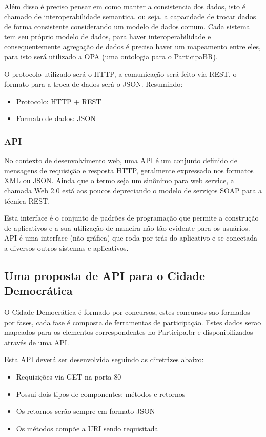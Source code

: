 \documentclass[12pt]{article}
\begin{document}
Além disso é preciso pensar em como manter a consistencia dos dados, isto é
chamado de interoperabilidade semantica, ou seja, a capacidade de trocar dados
de forma consistente considerando um modelo de dados comum. Cada sistema tem
seu próprio modelo de dados, para haver interoperabilidade e consequentemente
agregação de dados é preciso haver um mapeamento entre eles, para isto será
utilizado a OPA (uma ontologia para o ParticipaBR).

O protocolo utilizado será o HTTP, a comunicação será feito via REST,
o formato para a troca de dados será o JSON\cite{json}. Resumindo:

\begin{itemize}
  \item Protocolo: HTTP + REST
  \item Formato de dados: JSON
\end{itemize}

\subsubsection{API}

No contexto de desenvolvimento web, uma API é um conjunto definido de
mensagens de requisição e resposta HTTP, geralmente expressado nos formatos
XML ou JSON. Ainda que o termo seja um sinônimo para web service, a chamada Web
2.0 está aos poucos depreciando o modelo de serviços SOAP para a técnica REST.

Esta interface é o conjunto de padrões de programação que permite a construção
de aplicativos e a sua utilização de maneira não tão evidente para os
usuários. API é uma interface (não gráfica) que roda por trás do aplicativo e
se conectada a diversos outros sistemas e aplicativos.

\subsection{Uma proposta de API para o Cidade Democrática}

O Cidade Democrática é formado por concursos, estes concursos sao formados por
fases, cada fase é composta de ferramentas de participação. Estes dados serao
mapeados para os elementos correspondentes no Participa.br e disponibilizados
através de uma API.

Esta API deverá ser desenvolvida seguindo as diretrizes abaixo:

\begin{itemize}
  \item Requisições via GET na porta 80
  \item Possui dois tipos de componentes: métodos e retornos
  \item Os retornos serão sempre em formato JSON
  \item Os métodos compõe a URI sendo requisitada
\end{itemize}
\end{document}
